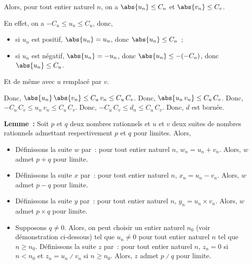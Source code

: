 \begin{itemize}[nosep]
            Alors, pour tout entier naturel $n$, on a $\abs{u_n} \leq C_u$ et $\abs{v_n} \leq C_v$.%
            \begin{foot}
                En effet, on a $-C_u \leq u_n \leq C_u$, donc,
                \begin{itemize}[nosep]
                    \item si $u_n$ est positif, $\abs{u_n} = u_n$, donc $\abs{u_n} \leq C_u$~;
                    \item si $u_n$ est négatif, $\abs{u_n} = -u_n$, donc $\abs{u_n} \leq -(-C_u)$, donc $\abs{u_n} \leq C_u$.
                \end{itemize}
                Et de même avec $u$ remplacé par $v$.
            \end{foot}
            Donc, $\abs{u_n} \, \abs{v_n} \leq C_u \, v_n \leq C_u \, C_v$.
            Donc, $\abs{u_n \, v_n} \leq C_u \, C_v$.
            Donc, $-C_u \, C_v \leq u_n \, v_n \leq C_u \, C_v$.
            Donc, $-C_u \, C_v \leq d_n \leq C_u \, C_v$.
            Donc, $d$ est bornée.
    \end{itemize}

    \done

\medskip

\noindent\textbf{Lemme :} Soit $p$ et $q$ deux nombres rationnels et $u$ et $v$ deux suites de nombres rationnels admettant respectivement $p$ et $q$ pour limites. 
    Alors, 
    \begin{itemize}[nosep]
        \item Définissons la suite $w$ par : pour tout entier naturel $n$, $w_n = u_n + v_n$. 
            Alors, $w$ admet $p + q$ pour limite.
        \item Définissons la suite $x$ par : pour tout entier naturel $n$, $x_n = u_n - v_n$. 
            Alors, $w$ admet $p - q$ pour limite.
        \item Définissons la suite $y$ par : pour tout entier naturel $n$, $y_n = u_n \times v_n$. 
            Alors, $w$ admet $p \times q$ pour limite.
        \item Supposons $q \neq 0$. 
            Alors, on peut choisir un entier naturel $n_0$ (voir démonstration ci-dessous) tel que $u_n \neq 0$ pour tout entier naturel $n$ tel que $n \geq n_0$.
            Définissons la suite $z$ par : pour tout entier naturel $n$, $z_n = 0$ si $n < n_0$ et $z_n = u_n \divslash v_n$ si $n \geq n_0$.
            Alors, $z$ admet $p \divslash q$ pour limite.
    \end{itemize}

